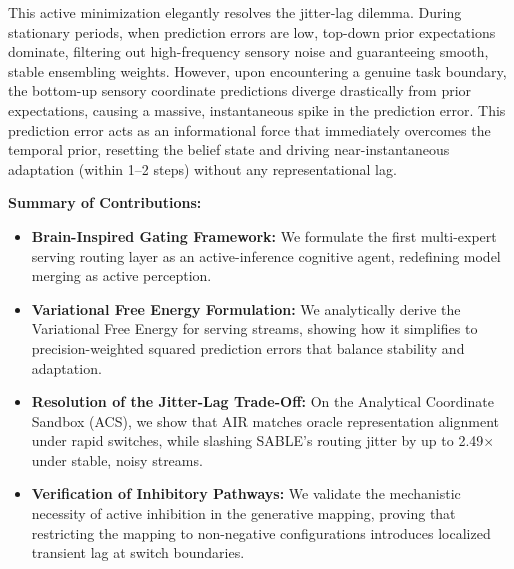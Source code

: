 This active minimization elegantly resolves the jitter-lag dilemma. During stationary periods, when prediction errors are low, top-down prior expectations dominate, filtering out high-frequency sensory noise and guaranteeing smooth, stable ensembling weights. However, upon encountering a genuine task boundary, the bottom-up sensory coordinate predictions diverge drastically from prior expectations, causing a massive, instantaneous spike in the prediction error. This prediction error acts as an informational force that immediately overcomes the temporal prior, resetting the belief state and driving near-instantaneous adaptation (within 1--2 steps) without any representational lag.

\textbf{Summary of Contributions:}
\begin{itemize}
    \item \textbf{Brain-Inspired Gating Framework:} We formulate the first multi-expert serving routing layer as an active-inference cognitive agent, redefining model merging as active perception.
    \item \textbf{Variational Free Energy Formulation:} We analytically derive the Variational Free Energy for serving streams, showing how it simplifies to precision-weighted squared prediction errors that balance stability and adaptation.
    \item \textbf{Resolution of the Jitter-Lag Trade-Off:} On the Analytical Coordinate Sandbox (ACS), we show that AIR matches oracle representation alignment under rapid switches, while slashing SABLE's routing jitter by up to 2.49$\times$ under stable, noisy streams.
    \item \textbf{Verification of Inhibitory Pathways:} We validate the mechanistic necessity of active inhibition in the generative mapping, proving that restricting the mapping to non-negative configurations introduces localized transient lag at switch boundaries.
\end{itemize}
